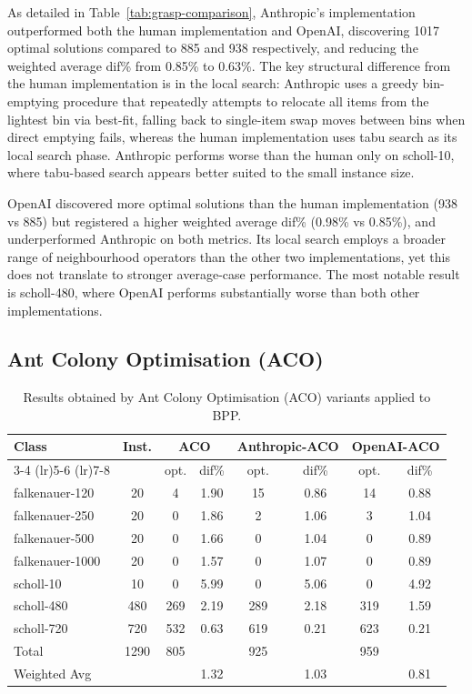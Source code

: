 \documentclass[11pt]{article}
\begin{document}
As detailed in Table~\ref{tab:grasp-comparison}, Anthropic's implementation outperformed both the human implementation and OpenAI, 
discovering 1017 optimal solutions compared to 885 and 938 respectively, and reducing 
the weighted average dif\% from 0.85\% to 0.63\%. The key structural difference from 
the human implementation is in the local search: Anthropic uses a greedy bin-emptying 
procedure that repeatedly attempts to relocate all items from the lightest bin via 
best-fit, falling back to single-item swap moves between bins when direct emptying 
fails, whereas the human implementation uses tabu search as its local search phase. 
Anthropic performs worse than the human only on scholl-10, where tabu-based search 
appears better suited to the small instance size.

OpenAI discovered more optimal solutions than the human implementation (938 vs 885) 
but registered a higher weighted average dif\% (0.98\% vs 0.85\%), and underperformed 
Anthropic on both metrics. Its local search employs a broader range of neighbourhood 
operators than the other two implementations, yet this does not translate to stronger 
average-case performance. The most notable result is scholl-480, where OpenAI performs 
substantially worse than both other implementations.

\subsection{Ant Colony Optimisation (ACO)}
\begin{table}[H]
\centering
\caption{Results obtained by Ant Colony Optimisation (ACO) variants applied to BPP.}
\label{tab:aco-comparison}
\begin{tabular}{l c cc cc cc}
\toprule
\multirow{2}{*}{Class} & \multirow{2}{*}{Inst.} & \multicolumn{2}{c}{ACO} & \multicolumn{2}{c}{Anthropic-ACO} & \multicolumn{2}{c}{OpenAI-ACO} \\
\cmidrule(lr){3-4} \cmidrule(lr){5-6} \cmidrule(lr){7-8}
 & & opt. & dif\% & opt. & dif\% & opt. & dif\% \\
\midrule
falkenauer-120  & 20   & 4    & 1.90 & 15   & 0.86 & 14   & 0.88 \\
falkenauer-250  & 20   & 0    & 1.86 & 2    & 1.06 & 3    & 1.04 \\
falkenauer-500  & 20   & 0    & 1.66 & 0    & 1.04 & 0    & 0.89 \\
falkenauer-1000 & 20   & 0    & 1.57 & 0    & 1.07 & 0    & 0.89 \\
scholl-10       & 10   & 0    & 5.99 & 0    & 5.06 & 0    & 4.92 \\
scholl-480      & 480  & 269  & 2.19 & 289  & 2.18 & 319  & 1.59 \\
scholl-720      & 720  & 532  & 0.63 & 619  & 0.21 & 623  & 0.21 \\
\midrule
Total           & 1290 & 805  &      & 925  &      & 959  &      \\
Weighted Avg    &      &      & 1.32 &      & 1.03 &      & 0.81 \\
\bottomrule
\end{tabular}
\end{table}
\end{document}
